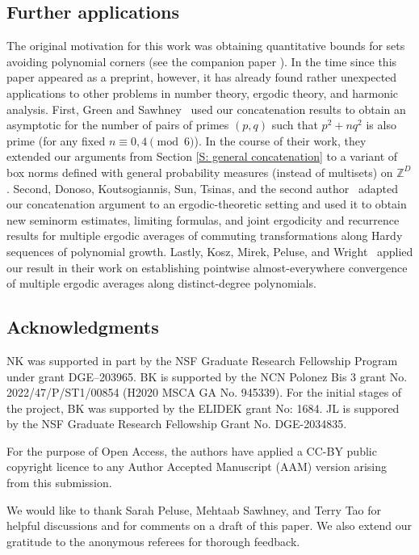 \documentclass[11pt]{amsart}
\theoremstyle{definition}
\newcommand{\Z}{{\mathbb Z}}
\begin{document}
\subsection{Further applications}
The original motivation for this work was obtaining quantitative bounds for sets avoiding polynomial corners (see the companion paper \cite{KKL24b}).  In the time since this paper appeared as a preprint, however, it has already found rather unexpected applications to other problems in number theory, ergodic theory, and harmonic analysis. First, Green and Sawhney~\cite{GS25} used our concatenation results to obtain an asymptotic for the number of pairs of primes $(p,q)$ such that $p^2 + nq^2$ is also prime (for any fixed $n \equiv 0,4 \pmod 6$). In the course of their work, they extended our arguments from Section \ref{S: general concatenation} to a variant of box norms defined with general probability measures (instead of multisets) on $\Z^D$. Second, Donoso, Koutsogiannis, Sun, Tsinas, and the second author~\cite{DKKST25, DKKST24} adapted our concatenation argument to an ergodic-theoretic setting and used it to obtain new seminorm estimates, limiting formulas, and joint ergodicity and recurrence results for multiple ergodic averages of commuting transformations along Hardy sequences of polynomial growth. Lastly, Kosz, Mirek, Peluse, and Wright~\cite{KMPW24} applied our result in their work on establishing pointwise almost-everywhere convergence of multiple ergodic averages along distinct-degree polynomials.

\subsection{Acknowledgments} NK was supported in part by the NSF Graduate Research Fellowship Program under grant DGE–203965. BK is supported by the NCN Polonez Bis 3 grant No. 2022/47/P/ST1/00854 (H2020 MSCA GA No. 945339). For the initial stages of the project, BK was supported by the ELIDEK grant No: 1684.  JL is suppored by the NSF Graduate Research Fellowship Grant No. DGE-2034835. 

For the purpose of Open Access, the authors have applied a CC-BY public copyright licence to any Author Accepted Manuscript (AAM) version arising from this submission.

We would like to thank Sarah Peluse, Mehtaab Sawhney, and Terry Tao for helpful discussions and for comments on a draft of this paper. We also extend our gratitude to the anonymous referees for thorough feedback.
\end{document}
